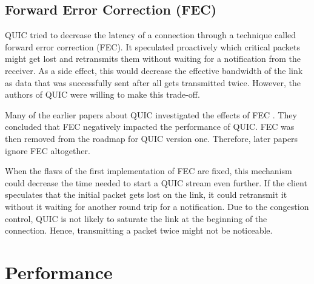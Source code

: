 \documentclass[conference]{IEEEtran}
\begin{document}
% 

\subsection{Forward Error Correction (FEC)}

QUIC tried to decrease the latency of a connection through a technique called forward error correction (FEC). It speculated proactively which critical packets might get lost and retransmits them without waiting for a notification from the receiver. As a side effect, this would decrease the effective bandwidth of the link as data that was successfully sent after all gets transmitted twice. However, the authors of QUIC were willing to make this trade-off. 

Many of the earlier papers about QUIC investigated the effects of FEC \cite{HTTPoverUDP}. They concluded that FEC negatively impacted the performance of QUIC. FEC was then removed from the roadmap for QUIC version one. Therefore, later papers ignore FEC altogether.

When the flaws of the first implementation of FEC are fixed, this mechanism could decrease the time needed to start a QUIC stream even further. If the client speculates that the initial packet gets lost on the link, it could retransmit it without it waiting for another round trip for a notification. Due to the congestion control, QUIC is not likely to saturate the link at the beginning of the connection. Hence, transmitting a packet twice might not be noticeable.


\section{Performance}
\label{sec:Performance}

\end{document}
